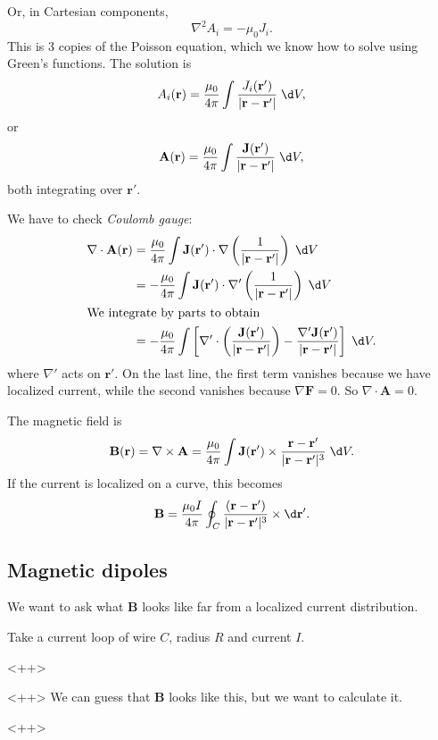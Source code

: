 \documentclass[a4paper]{article}
\begin{document}
Or, in Cartesian components,
\[
  \nabla^2 A_i = -\mu_0 J_i.
\]
This is 3 copies of the Poisson equation, which we know how to solve using Green's functions. The solution is
\[
  A_i (\mathbf{r}) = \frac{\mu_0}{4\pi}\int \frac{J_i (\mathbf{r}')}{|\mathbf{r} - \mathbf{r}'|}\;\d V,
\]
or
\[
  \mathbf{A}(\mathbf{r}) = \frac{\mu_0}{4\pi}\int \frac{\mathbf{J}(\mathbf{r'})}{|\mathbf{r} - \mathbf{r}'|}\;\d V,
\]
both integrating over $\mathbf{r}'$.

We have to check \emph{Coulomb gauge}:
\begin{align*}
  \nabla\cdot \mathbf{A}(\mathbf{r}) &= \frac{\mu_0}{4\pi}\int \mathbf{J}(\mathbf{r}')\cdot \nabla\left(\frac{1}{|\mathbf{r} - \mathbf{r}'|}\right)\;\d V\\
  &= -\frac{\mu_0}{4\pi}\int \mathbf{J}(\mathbf{r}') \cdot \nabla'\left(\frac{1}{|\mathbf{r} - \mathbf{r}'|}\right)\;\d V\\
  \intertext{We integrate by parts to obtain}
  &= -\frac{\mu_0}{4\pi}\int \left[\nabla'\cdot \left(\frac{\mathbf{J}(\mathbf{r}')}{|\mathbf{r} - \mathbf{r}'|}\right) - \frac{\nabla' \mathbf{J}(\mathbf{r}')}{|\mathbf{r} - \mathbf{r}'|}\right]\;\d V.
\end{align*}
where $\nabla'$ acts on $\mathbf{r}'$. On the last line, the first term vanishes because we have localized current, while the second vanishes because $\nabla \mathbf{F} = 0$. So $\nabla\cdot \mathbf{A} = 0$.

\begin{law}
  The magnetic field is
  \[
    \mathbf{B}(\mathbf{r}) = \nabla \times \mathbf{A} = \frac{\mu_0}{4\pi}\int \mathbf{J}(\mathbf{r}')\times \frac{\mathbf{r} - \mathbf{r}'}{|\mathbf{r} - \mathbf{r}'|^3}\;\d V.
  \]
  If the current is localized on a curve, this becomes
  \[
    \mathbf{B} = \frac{\mu_0 I}{4\pi}\oint_C \frac{(\mathbf{r} - \mathbf{r}')}{|\mathbf{r} - \mathbf{r}'|^3}\times \d \mathbf{r}'.
  \]
\end{law}

\subsection{Magnetic dipoles}
We want to ask what $\mathbf{B}$ looks like far from a localized current distribution.

\begin{eg}
  Take a current loop of wire $C$, radius $R$ and current $I$. 
  \begin{center}
    <++>
  \end{center}<++>
  We can guess that $\mathbf{B}$ looks like this, but we want to calculate it.
\end{eg}<++>
\end{document}

